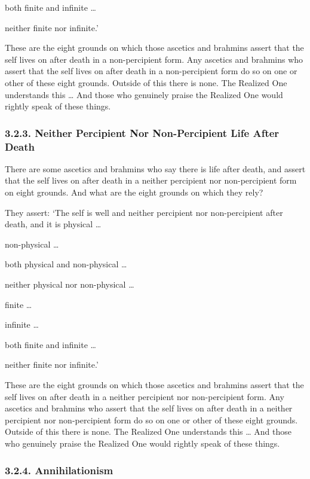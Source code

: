 \documentclass[12pt,openany]{book}%
\begin{document}
both finite and infinite … 

neither finite nor infinite.’ 

These are the eight grounds on which those ascetics and brahmins assert that the self lives on after death in a non-percipient form. Any ascetics and brahmins who assert that the self lives on after death in a non-percipient form do so on one or other of these eight grounds. Outside of this there is none. The Realized One understands this … And those who genuinely praise the Realized One would rightly speak of these things. 

\subsubsection*{3.2.3. Neither Percipient Nor Non-Percipient Life After Death }

There are some ascetics and brahmins who say there is life after death, and assert that the self lives on after death in a neither percipient nor non-percipient form on eight grounds. And what are the eight grounds on which they rely? 

They assert: ‘The self is well and neither percipient nor non-percipient after death, and it is physical … 

non-physical … 

both physical and non-physical … 

neither physical nor non-physical … 

finite … 

infinite … 

both finite and infinite … 

neither finite nor infinite.’ 

These are the eight grounds on which those ascetics and brahmins assert that the self lives on after death in a neither percipient nor non-percipient form. Any ascetics and brahmins who assert that the self lives on after death in a neither percipient nor non-percipient form do so on one or other of these eight grounds. Outside of this there is none. The Realized One understands this … And those who genuinely praise the Realized One would rightly speak of these things. 

\subsubsection*{3.2.4. Annihilationism }
\end{document}
